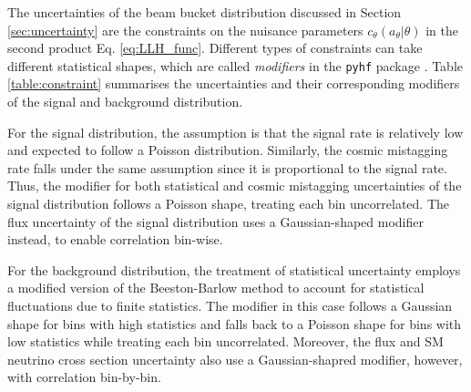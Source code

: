 The uncertainties of the beam bucket distribution discussed in Section \ref{sec:uncertainty} are the constraints on the nuisance parameters $c_\theta(a_\theta|\theta)$ in the second product Eq. \ref{eq:LLH_func}.
Different types of constraints can take different statistical shapes, which are called \textit{modifiers} in the \texttt{pyhf} package \cite{pyhf, pyhf_joss}.
Table \ref{table:constraint} summarises the uncertainties and their corresponding modifiers of the signal and background distribution.


For the signal distribution, the assumption is that the signal rate is relatively low and expected to follow a Poisson distribution.
Similarly, the cosmic mistagging rate falls under the same assumption since it is proportional to the signal rate. 
Thus, the modifier for both statistical and cosmic mistagging uncertainties of the signal distribution follows a Poisson shape, treating each bin uncorrelated. 
The flux uncertainty of the signal distribution uses a Gaussian-shaped modifier instead, to enable correlation bin-wise.

For the background distribution, the treatment of statistical uncertainty employs a modified version of the Beeston-Barlow method \cite{BeestonBarlow} to account for statistical fluctuations due to finite statistics.
The modifier in this case follows a Gaussian shape for bins with high statistics and falls back to a Poisson shape for bins with low statistics while treating each bin uncorrelated.                                            
Moreover, the flux and SM neutrino cross section uncertainty also use a Gaussian-shapred modifier, however, with correlation bin-by-bin.

